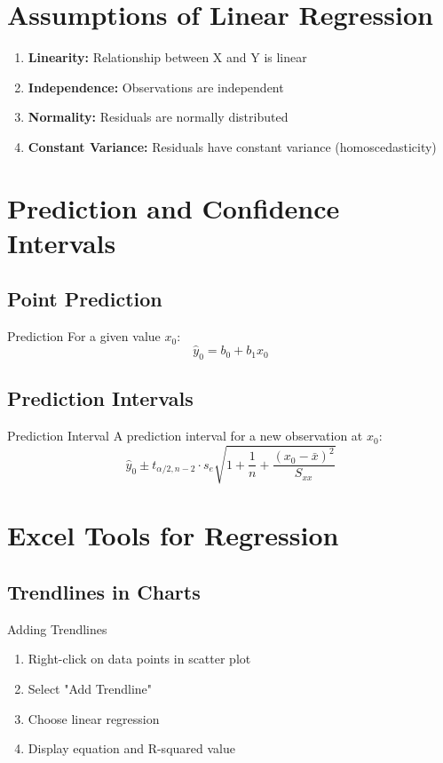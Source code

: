 \documentclass[12pt,a4paper]{book}
\begin{document}
\section{Assumptions of Linear Regression}

\begin{enumerate}
    \item \textbf{Linearity:} Relationship between X and Y is linear
    \item \textbf{Independence:} Observations are independent
    \item \textbf{Normality:} Residuals are normally distributed
    \item \textbf{Constant Variance:} Residuals have constant variance (homoscedasticity)
\end{enumerate}

\section{Prediction and Confidence Intervals}

\subsection{Point Prediction}

\begin{definition}{Prediction}
For a given value $x_0$:
\[
\hat{y}_0 = b_0 + b_1 x_0
\]
\end{definition}

\subsection{Prediction Intervals}

\begin{definition}{Prediction Interval}
A prediction interval for a new observation at $x_0$:
\[
\hat{y}_0 \pm t_{\alpha/2, n-2} \cdot s_e \sqrt{1 + \frac{1}{n} + \frac{(x_0 - \bar{x})^2}{S_{xx}}}
\]
\end{definition}

\section{Excel Tools for Regression}

\subsection{Trendlines in Charts}

\begin{example}{Adding Trendlines}
\begin{enumerate}
    \item Right-click on data points in scatter plot
    \item Select "Add Trendline"
    \item Choose linear regression
    \item Display equation and R-squared value
\end{enumerate}
\end{example}
\end{document}
